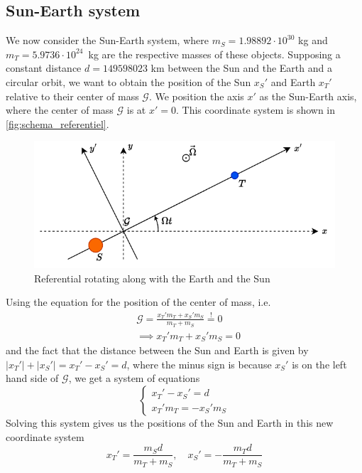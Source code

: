 \subsection{Sun-Earth system}

We now consider the Sun-Earth system, where \(m_S = 1.98892 \cdot 10^{30}\) kg and \hbox{\(m_T = 5.9736 \cdot 10^{24}\) kg} are the respective masses of these objects. Supposing a constant distance \(d = 149598023\) km between the Sun and the Earth and a circular orbit, we want to obtain the position of the Sun \(x_S'\) and Earth \(x_T'\) relative to their center of mass \(\mathcal G\). We position the axis \(x'\) as the Sun-Earth axis, where the center of mass \(\mathcal G\) is at \(x'=0\). This coordinate system is shown in \autoref{fig:schema_referentiel}.
\begin{figure}[h]
    \centering
    \includegraphics[width=0.8\linewidth]{figures/referentiel.pdf}
    \caption{Referential rotating along with the Earth and the Sun}
    \label{fig:schema_referentiel}
\end{figure}
Using the equation for the position of the center of mass, i.e.
\begin{equation}
    \begin{aligned}
        &\mathcal G = \frac{x_T' m_T + x_S' m_S}{m_T + m_S} \stackrel{!}{=} 0 \\
        &\implies x_T' m_T + x_S' m_S = 0
    \end{aligned}
\end{equation}
and the fact that the distance between the Sun and Earth is given by \(|x_T'|+|x_S'| = x_T' - x_S' = d\), where the minus sign is because \(x_S'\) is on the left hand side of \(\mathcal G\), we get a system of equations
\begin{equation}
    \begin{cases}
        x_T' - x_S' = d \\
        x_T' m_T = -x_S' m_S
    \end{cases}
\end{equation}
Solving this system gives us the positions of the Sun and Earth in this new coordinate system
\begin{equation}
    x_T' = \frac{m_S d}{m_T + m_S}, \quad x_S' = - \frac{m_T d}{m_T + m_S}
    \label{eq:pos_earth_sun}
\end{equation}

